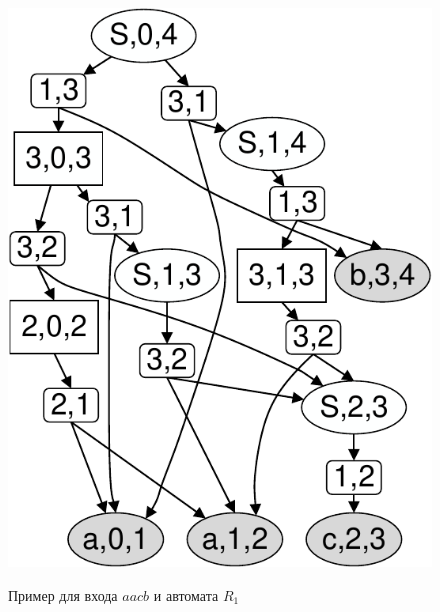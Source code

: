 \begin{figure}[ht]
{		\includegraphics[scale=.4]{./Gorohov/pictures/G0SPPFwithPackedNodes.pdf}
		\label{fig:SPPFForG0}
	}
	\caption{Пример для входа $ aacb $ и автомата $R_1$}
	\label{fig:fig2}
\end{figure}

